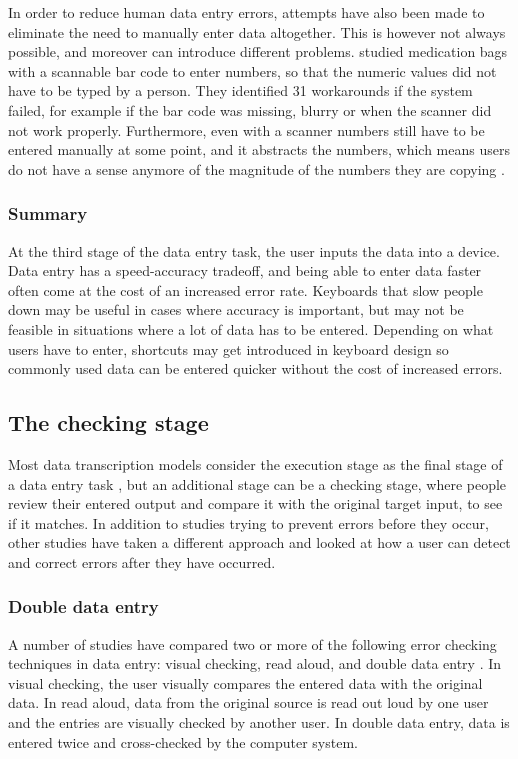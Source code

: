 In order to reduce human data entry errors, attempts have also been made to eliminate the need to manually enter data altogether. This is however not always possible, and moreover can introduce different problems.
\citet{Koppel2008} studied medication bags with a scannable bar code to enter numbers, so that the numeric values did not have to be typed by a person. They identified 31 workarounds if the system failed, for example if the bar code was missing, blurry or when the scanner did not work properly. Furthermore, even with a scanner numbers still have to be entered manually at some point, and it abstracts the numbers, which means users do not have a sense anymore of the magnitude of the numbers they are copying \citep{Wiseman2013a}. 

\subsubsection{Summary}
At the third stage of the data entry task, the user inputs the data into a device. Data entry has a speed-accuracy tradeoff, and being able to enter data faster often come at the cost of an increased error rate. 
Keyboards that slow people down may be useful in cases where accuracy is important, but may not be feasible in situations where a lot of data has to be entered. Depending on what users have to enter, shortcuts may get introduced in keyboard design so commonly used data can be entered quicker without the cost of increased errors. 

\subsection{The checking stage}
Most data transcription models consider the execution stage as the final stage of a data entry task \citep{Card1983, Salthouse1986}, but an additional stage can be a checking stage, where people review their entered output and compare it with the original target input, to see if it matches. 
In addition to studies trying to prevent errors before they occur, other studies have taken a different approach and looked at how a user can detect and correct errors after they have occurred. 

\subsubsection{Double data entry}
A number of studies have compared two or more of the following error checking techniques in data entry: visual checking, read aloud, and double data entry \citep{Barchard2011, Barchard2013, Kawado2003}. In visual checking, the user visually compares the entered data with the original data. In read aloud, data from the original source is read out loud by one user and the entries are visually checked by another user. In double data entry, data is entered twice and cross-checked by the computer system. 

